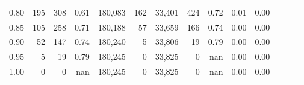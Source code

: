 \begin{tabular}{rrrrrrrrrrrrrr}
0.80 &     195 &    308 &  0.61 &  180,083 &      162 &  33,401 &     424 &  0.72 &  0.01 &      0.00 \\
0.85 &     105 &    258 &  0.71 &  180,188 &       57 &  33,659 &     166 &  0.74 &  0.00 &      0.00 \\
0.90 &      52 &    147 &  0.74 &  180,240 &        5 &  33,806 &      19 &  0.79 &  0.00 &      0.00 \\
0.95 &       5 &     19 &  0.79 &  180,245 &        0 &  33,825 &       0 &   nan &  0.00 &      0.00 \\
1.00 &       0 &      0 &   nan &  180,245 &        0 &  33,825 &       0 &   nan &  0.00 &      0.00 \\
\bottomrule
\end{tabular}
